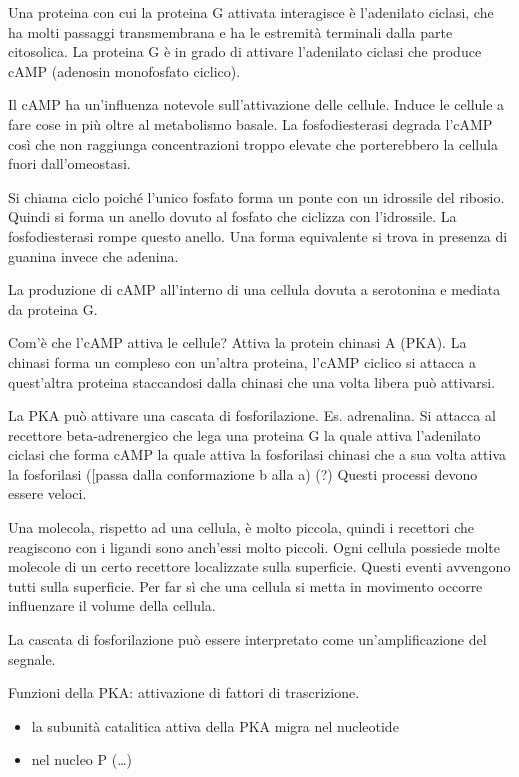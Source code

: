 \documentclass[]{article}
\begin{document}
Una proteina con cui la proteina G attivata interagisce è l'adenilato
ciclasi, che ha molti passaggi transmembrana e ha le estremità terminali
dalla parte citosolica. La proteina G è in grado di attivare l'adenilato
ciclasi che produce cAMP (adenosin monofosfato ciclico).

Il cAMP ha un'influenza notevole sull'attivazione delle cellule. Induce
le cellule a fare cose in più oltre al metabolismo basale. La
fosfodiesterasi degrada l'cAMP così che non raggiunga concentrazioni
troppo elevate che porterebbero la cellula fuori dall'omeostasi.

Si chiama ciclo poiché l'unico fosfato forma un ponte con un idrossile
del ribosio. Quindi si forma un anello dovuto al fosfato che ciclizza
con l'idrossile. La fosfodiesterasi rompe questo anello. Una forma
equivalente si trova in presenza di guanina invece che adenina.

La produzione di cAMP all'interno di una cellula dovuta a serotonina e
mediata da proteina G.

Com'è che l'cAMP attiva le cellule? Attiva la protein chinasi A (PKA).
La chinasi forma un compleso con un'altra proteina, l'cAMP ciclico si
attacca a quest'altra proteina staccandosi dalla chinasi che una volta
libera può attivarsi.

La PKA può attivare una cascata di fosforilazione. Es. adrenalina. Si
attacca al recettore beta-adrenergico che lega una proteina G la quale
attiva l'adenilato ciclasi che forma cAMP la quale attiva la fosforilasi
chinasi che a sua volta attiva la fosforilasi ({[}passa dalla
conformazione b alla a) (?) Questi processi devono essere veloci.

Una molecola, rispetto ad una cellula, è molto piccola, quindi i
recettori che reagiscono con i ligandi sono anch'essi molto piccoli.
Ogni cellula possiede molte molecole di un certo recettore localizzate
sulla superficie. Questi eventi avvengono tutti sulla superficie. Per
far sì che una cellula si metta in movimento occorre influenzare il
volume della cellula.

La cascata di fosforilazione può essere interpretato come
un'amplificazione del segnale.

Funzioni della PKA: attivazione di fattori di trascrizione.

\begin{itemize}
\itemsep1pt\parskip0pt
\item
  la subunità catalitica attiva della PKA migra nel nucleotide
\item
  nel nucleo P (\ldots{})
\end{itemize}
\end{document}
